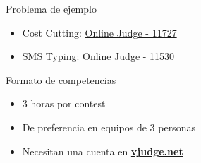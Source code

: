 \documentclass[10pt]{beamer}
\newcommand{\bi}{\begin{itemize}}
\newcommand{\ei}{\end{itemize}}
\begin{document}
\begin{frame}{Problema de ejemplo}
    \bi
        \item Cost Cutting: \href{https://vjudge.net/problem/UVA-11727}{Online Judge - 11727}
        \item SMS Typing: \href{https://vjudge.net/problem/UVA-11530}{Online Judge - 11530}
    \ei
\end{frame}

\begin{frame}{Formato de competencias}
    \bi
        \item 3 horas por contest
        \item De preferencia en equipos de 3 personas
        \item Necesitan una cuenta en \textbf{\href{https://vjudge.net}{vjudge.net}}
    \ei
\end{frame}
\end{document}
